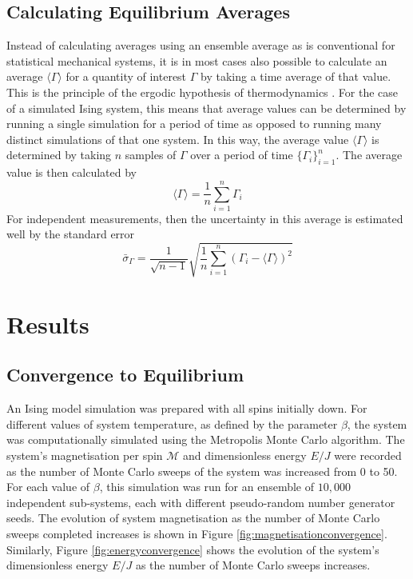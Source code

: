 \documentclass[11pt]{iopart}
\begin{document}
\subsection{Calculating Equilibrium Averages}

Instead of calculating averages using an ensemble average as is conventional for statistical mechanical systems, it is in most cases also possible to calculate an average $\langle \Gamma \rangle$ for a quantity of interest $\Gamma$ by taking a time average of that value. This is the principle of the ergodic hypothesis of thermodynamics \cite{statmech}.  For the case of a simulated Ising system, this means that average values can be determined by running a single simulation for a period of time as opposed to running many distinct simulations of that one system. In this way, the average value $\langle \Gamma \rangle$ is determined by taking $n$ samples of $\Gamma$ over a period of time $\{ \Gamma_i \}_{i=1}^{n}$. The average value is then calculated by
\begin{equation}
\langle \Gamma \rangle = \frac{1}{n}\sum_{i=1}^{n} \Gamma_i
\end{equation}
For independent measurements, then the uncertainty in this average is estimated well by the standard error
\begin{equation}
\bar{\sigma}_{\Gamma} = \frac{1}{\sqrt{n-1}} \sqrt{ \frac{1}{n} \sum_{i=1}^{n} \left( \Gamma_i - \langle \Gamma \rangle \right)^2 }
\end{equation}

\section{Results}

\subsection{Convergence to Equilibrium}

An Ising model simulation was prepared with all spins initially down. For different values of system temperature, as defined by the parameter $\beta$, the system was computationally simulated using the Metropolis Monte Carlo algorithm. The system's magnetisation per spin $\mathcal{M}$ and dimensionless energy $E/J$ were recorded as the number of Monte Carlo sweeps of the system was increased from 0 to 50. For each value of $\beta$, this simulation was run for an ensemble of $10,000$ independent sub-systems, each with different pseudo-random number generator seeds. The evolution of system magnetisation as the number of Monte Carlo sweeps completed increases is shown in Figure \ref{fig:magnetisationconvergence}. Similarly, Figure \ref{fig:energyconvergence} shows the evolution of the system's dimensionless energy $E/J$ as the number of Monte Carlo sweeps increases.
\end{document}
